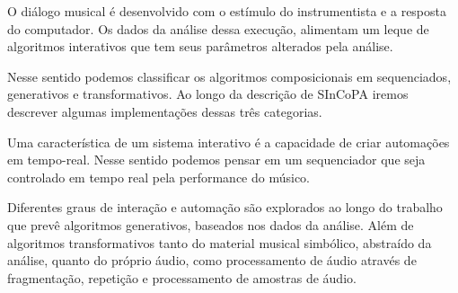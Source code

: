 \documentclass{ppgmus}
\begin{document}
O diálogo musical é desenvolvido com o estímulo
do instrumentista e a resposta do computador. Os dados
da análise dessa execução, alimentam um leque de algoritmos
interativos que tem seus parâmetros alterados pela análise.

Nesse sentido podemos classificar os algoritmos composicionais
em sequenciados, generativos e transformativos\cite{rowe93:interactive}.
Ao longo da descrição de SInCoPA iremos descrever algumas implementações
dessas três categorias.

Uma característica de um sistema interativo é a capacidade de criar
automações em tempo-real. Nesse sentido podemos pensar em um sequenciador
que seja controlado em tempo real pela performance do músico.

Diferentes graus de interação e automação são explorados ao longo do
trabalho que prevê algoritmos generativos, baseados nos dados da análise. 
Além de algoritmos transformativos tanto do material musical simbólico,
abstraído da análise, quanto do próprio áudio, como processamento de áudio
através de fragmentação, repetição e processamento de amostras de áudio.
\end{document}
